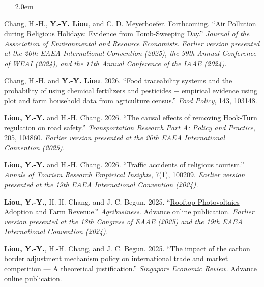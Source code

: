 \documentclass[11pt,letterpaper]{article}
\newenvironment{hanglist}{\par\setlength{\parindent}{0pt}\everypar={\hangindent=2.0em\hangafter=1}}{\par}
\begin{document}
\begin{hanglist}

Chang, H.-H., \textbf{Y.-Y. Liou}, and C. D.
Meyerhoefer. Forthcoming. ``\href{https://doi.org/10.1086/743452}{Air
Pollution during Religious Holidays: Evidence from Tomb-Sweeping Day}.''
\emph{Journal of the Association of Environmental and Resource
Economists}.
\newline \textit{\href{https://ssrn.com/abstract=4984614}{Earlier version} presented at the 20th EAEA International Convention (2025), the 99th Annual Conference of WEAI (2024), and the 11th Annual Conference of the IAAE (2024).}

Chang, H.-H. and \textbf{Y.-Y. Liou}. 2026.
``\href{https://doi.org/10.1016/j.foodpol.2026.103148}{Food traceability
systems and the probability of using chemical fertilizers and pesticides
− empirical evidence using plot and farm household data from agriculture
census}.'' \emph{Food Policy}, 143, 103148.

\textbf{Liou, Y.-Y.} and H.-H. Chang. 2026.
``\href{https://doi.org/10.1016/j.tra.2026.104860}{The causal effects of
removing Hook-Turn regulation on road safety}.'' \emph{Transportation
Research Part A: Policy and Practice}, 205, 104860.
\newline \textit{Earlier version presented at the 20th EAEA International Convention (2025).}

\textbf{Liou, Y.-Y.} and H.-H. Chang. 2026.
``\href{https://doi.org/10.1016/j.annale.2026.100209}{Traffic accidents
of religious tourism}.'' \emph{Annals of Tourism Research Empirical
Insights}, 7(1), 100209.
\newline \textit{Earlier version presented at the 19th EAEA International Convention (2024).}

\textbf{Liou, Y.-Y.}, H.-H. Chang, and J. C.
Begun. 2025.
``\href{https://onlinelibrary.wiley.com/doi/abs/10.1002/agr.70035}{Rooftop
Photovoltaics Adoption and Farm Revenue}.'' \emph{Agribusiness}. Advance
online publication.
\newline \textit{Earlier version presented at the 18th Congress of EAAE (2025) and the 19th EAEA International Convention (2024).}

\textbf{Liou, Y.-Y.}, H.-H. Chang, and J. C.
Begun. 2025.
``\href{https://www.worldscientific.com/doi/10.1142/S0217590825500328}{The
impact of the carbon border adjustment mechanism policy on international
trade and market competition --- A theoretical justification}.''
\emph{Singapore Economic Review}. Advance online publication.


\end{hanglist}
\end{document}
